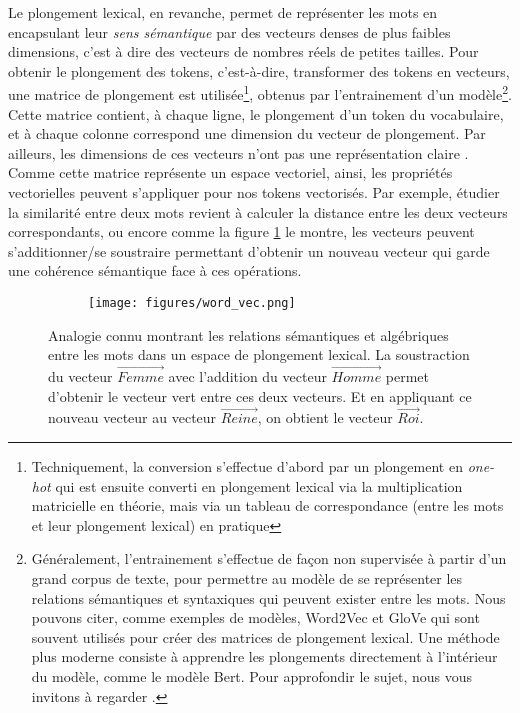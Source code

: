 \documentclass[12pt, twoside]{report}
\begin{document}
Le plongement lexical, en revanche, permet de représenter les mots en encapsulant leur \textit{sens sémantique} par des vecteurs denses de plus faibles dimensions, c'est à dire des vecteurs de nombres réels de petites tailles. Pour obtenir le plongement des tokens, c'est-à-dire, transformer des tokens en vecteurs, une matrice de plongement est utilisée\footnote{Techniquement, la conversion s'effectue d'abord par un plongement en \textit{one-hot} qui est ensuite converti en plongement lexical via la multiplication matricielle en théorie, mais via un tableau de correspondance (entre les mots et leur plongement lexical) en pratique}, obtenus par l'entrainement d'un modèle\footnote{Généralement, l'entrainement s'effectue de façon non supervisée à partir d'un grand corpus de texte, pour permettre au modèle de se représenter les relations sémantiques et syntaxiques qui peuvent exister entre les mots. Nous pouvons citer, comme exemples de modèles, Word2Vec et GloVe qui sont souvent utilisés pour créer des matrices de plongement lexical. Une méthode plus moderne consiste à apprendre les plongements directement à l'intérieur du modèle, comme le modèle Bert. Pour approfondir le sujet, nous vous invitons à regarder \autocite[chap.~6, 7, 11]{jurafsky}.}. Cette matrice contient, à chaque ligne, le plongement d'un \gls{token} du vocabulaire, et à chaque colonne correspond une dimension du vecteur de plongement. Par ailleurs, les dimensions de ces vecteurs n'ont pas une représentation claire \autocite[chap.~6]{jurafsky}. Comme cette matrice représente un espace vectoriel, ainsi, les propriétés vectorielles peuvent s'appliquer pour nos tokens vectorisés. Par exemple, étudier la similarité entre deux mots revient à calculer la distance entre les deux vecteurs correspondants, ou encore comme la figure \ref{fig:wordvec} le montre, les vecteurs peuvent s'additionner/se soustraire permettant d'obtenir un nouveau vecteur qui garde une cohérence sémantique face à ces opérations. \autocite{rumel} \autocite{lund}

\begin{figure}[!h]
    \centering
    \begin{subfigure}[b]{0.6\textwidth}
        \texttt{[image: figures/word\_vec.png]}
    \end{subfigure}
    \caption{Analogie connu montrant les relations sémantiques et algébriques entre les mots dans un espace de plongement lexical. La soustraction du vecteur $\overrightarrow{Femme}$ avec l'addition du vecteur $\overrightarrow{Homme}$ permet d'obtenir le vecteur vert entre ces deux vecteurs. Et en appliquant ce nouveau vecteur au vecteur $\overrightarrow{Reine}$, on obtient le vecteur $\overrightarrow{Roi}$.}
    \label{fig:wordvec}
\end{figure}
\end{document}

